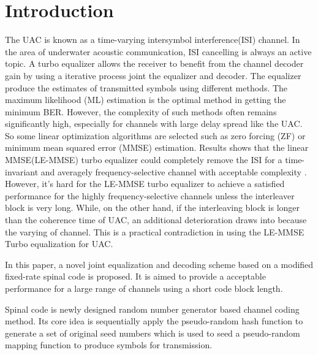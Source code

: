 \documentclass[conference]{IEEEtran}
\begin{document}
\section{Introduction}
The UAC is known as a time-varying intersymbol interference(ISI) channel. In the area of underwater acoustic communication, ISI cancelling is always an active topic. A turbo equalizer\cite{douillard1995iterative}
allows the receiver to benefit from the channel decoder gain by using a iterative process joint the equalizer and decoder. The equalizer produce the estimates of transmitted symbols using different methods. The maximum likelihood (ML) estimation is the optimal method in getting the minimum BER. However, the complexity of such methods often remains significantly high, especially for channels with large delay spread like the UAC. So some linear optimization algorithms are selected such as zero forcing (ZF) or minimum mean squared error (MMSE) estimation.   
Results shows that the linear MMSE(LE-MMSE) turbo equalizer could completely remove the ISI for a time-invariant and averagely frequency-selective channel with acceptable complexity \cite{laot2001turbo}. However, it's hard for the LE-MMSE  turbo equalizer to achieve a satisfied performance for the highly frequency-selective channels unless the interleaver block  is very long. While, on the other hand, if the interleaving block is longer than the coherence  time of UAC, an additional deterioration draws into because the varying of channel. This is a practical contradiction in using the LE-MMSE Turbo equalization for UAC.


In this paper, a novel joint equalization and decoding scheme based on a modified fixed-rate spinal code is proposed. It is aimed to provide a acceptable performance for a large range of channels using a short code block length.  

Spinal code is newly designed \cite{perry2012spinal}
random number generator based channel coding method. Its core idea is sequentially apply the pseudo-random hash function to generate a set of original seed numbers which is used to seed a pseudo-random mapping function to produce symbols for transmission. 
\end{document}
